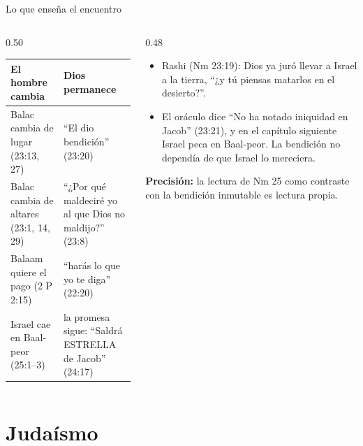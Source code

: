 \documentclass[hyperref={bookmarks=false},aspectratio=169]{beamer}
\newcommand{\precision}[1]{{\footnotesize\color{gris}\textbf{Precisión:} #1}}
\begin{document}
\begin{frame}{Lo que enseña el encuentro}
\begin{columns}[t,onlytextwidth]
\begin{column}{0.50\textwidth}
\scriptsize\renewcommand{\arraystretch}{1.2}
\begin{tabular}{@{}>{\RaggedRight\arraybackslash}p{2.4cm}>{\RaggedRight\arraybackslash}p{3.3cm}@{}}
\toprule
\textbf{El hombre cambia} & \textbf{Dios permanece} \\ \midrule
Balac cambia de lugar (23:13, 27) & ``El dio bendición'' (23:20) \\
Balac cambia de altares (23:1, 14, 29) & ``¿Por qué maldeciré yo al que Dios no maldijo?'' (23:8) \\
Balaam quiere el pago (2 P 2:15) & ``harás lo que yo te diga'' (22:20) \\
Israel cae en Baal-peor (25:1--3) & la promesa sigue: ``Saldrá ESTRELLA de Jacob'' (24:17) \\
\bottomrule
\end{tabular}
\end{column}
\begin{column}{0.48\textwidth}\small
\begin{itemize}
\item Rashi (Nm 23:19): Dios ya juró llevar a Israel a la tierra, ``¿y tú piensas matarlos en el desierto?''.
\item El oráculo dice ``No ha notado iniquidad en Jacob'' (23:21), y en el capítulo siguiente Israel peca en Baal-peor. La bendición no dependía de que Israel lo mereciera.
\end{itemize}
\precision{la lectura de Nm 25 como contraste con la bendición inmutable es lectura propia.}
\end{column}
\end{columns}
\end{frame}

\section{Judaísmo}
\end{document}
